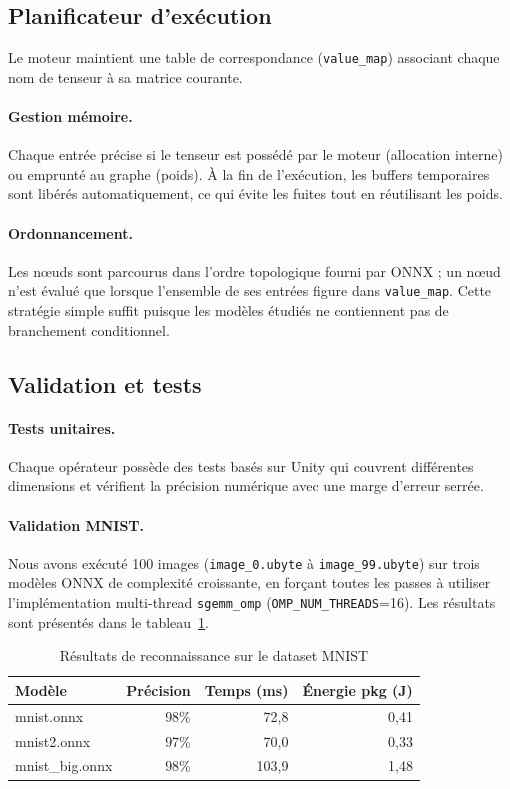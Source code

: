 \documentclass[a4paper,11pt]{article}
\begin{document}
\subsection{Planificateur d'exécution}

Le moteur maintient une table de correspondance (\texttt{value\_map}) associant chaque nom de tenseur à sa matrice courante.

\paragraph{Gestion mémoire.} Chaque entrée précise si le tenseur est possédé par le moteur (allocation interne) ou emprunté au graphe (poids). À la fin de l'exécution, les buffers temporaires sont libérés automatiquement, ce qui évite les fuites tout en réutilisant les poids.

\paragraph{Ordonnancement.} Les nœuds sont parcourus dans l'ordre topologique fourni par ONNX ; un nœud n'est évalué que lorsque l'ensemble de ses entrées figure dans \texttt{value\_map}. Cette stratégie simple suffit puisque les modèles étudiés ne contiennent pas de branchement conditionnel.

\subsection{Validation et tests}

\paragraph{Tests unitaires.} Chaque opérateur possède des tests basés sur Unity qui couvrent différentes dimensions et vérifient la précision numérique avec une marge d'erreur serrée.

\paragraph{Validation MNIST.} Nous avons exécuté 100 images (\texttt{image\_0.ubyte} à \texttt{image\_99.ubyte}) sur trois modèles ONNX de complexité croissante, en forçant toutes les passes à utiliser l'implémentation multi-thread \texttt{sgemm\_omp} (\texttt{OMP\_NUM\_THREADS}=16). Les résultats sont présentés dans le tableau~\ref{tab:mnist}.

\begin{table}[H]
\centering
\caption{Résultats de reconnaissance sur le dataset MNIST}
\label{tab:mnist}
\small
\begin{tabular}{lrrr}
\toprule
Modèle & Précision & Temps (ms) & Énergie pkg (J) \\
\midrule
mnist.onnx & 98\% & 72{,}8 & 0{,}41 \\
mnist2.onnx & 97\% & 70{,}0 & 0{,}33 \\
mnist\_big.onnx & 98\% & 103{,}9 & 1{,}48 \\
\bottomrule
\end{tabular}
\end{table}
\end{document}
